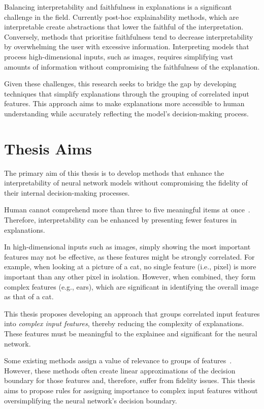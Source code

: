 Balancing interpretability and faithfulness in explanations is a significant challenge in the field. Currently post-hoc explainability methods, which are interpretable create abstractions that lower the faithful of the interpretation. Conversely, methods that prioritise faithfulness tend to decrease interpretability by overwhelming the user with excessive information. Interpreting models that process high-dimensional inputs, such as images, requires simplifying vast amounts of information without compromising the faithfulness of the explanation.

Given these challenges, this research seeks to bridge the gap by developing techniques that simplify explanations through the grouping of correlated input features. This approach aims to make explanations more accessible to human understanding while accurately reflecting the model's decision-making process.

\section{Thesis Aims}

The primary aim of this thesis is to develop methods that enhance the interpretability of neural network models without compromising the fidelity of their internal decision-making processes.

Human cannot comprehend more than three to five meaningful items at once~\cite{cowan2001magical, starkey1995development, morris2018human}. Therefore, interpretability can be enhanced by presenting fewer features in explanations.

In high-dimensional inputs such as images, simply showing the most important features may not be effective, as these features might be strongly correlated. For example, when looking at a picture of a cat, no single feature (i.e., pixel) is more important than any other pixel in isolation. However, when combined, they form complex features (e.g., ears), which are significant in identifying the overall image as that of a cat.

This thesis proposes developing an approach that groups correlated input features into \emph{complex input features}, thereby reducing the complexity of explanations. These features must be meaningful to the explainee and significant for the neural network.

Some existing methods assign a value of relevance to groups of features~\cite{Ribeiro0G16, LundbergL17}. However, these methods often create linear approximations of the decision boundary for those features and, therefore, suffer from fidelity issues. This thesis aims to propose rules for assigning importance to complex input features without oversimplifying the neural network's decision boundary. 

